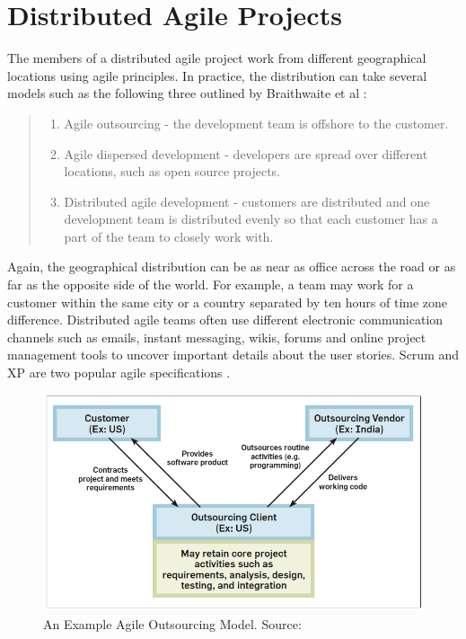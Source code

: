 \section{Distributed Agile Projects}
The members of a distributed agile project work from different geographical locations using agile principles. In practice, the distribution can take several models such as the following three outlined by Braithwaite et al \cite{xp_expanded}:

\begin{quote}
\begin{enumerate}
	\item Agile outsourcing - the development team is offshore to the customer.
	\item Agile dispersed development - developers are spread over different locations, such as open source projects.
	\item Distributed agile development - customers are distributed and one development team is distributed evenly so that each customer has a part of the team to closely work with.
\end{enumerate}
\end{quote}

Again, the geographical distribution can be as near as office across the road or as far as the opposite side of the world. For example, a team may work for a customer within the same city or a country separated by ten hours of time zone difference. Distributed agile teams often use different electronic communication channels such as emails, instant messaging, wikis, forums and online project management tools to uncover important details about the user stories. Scrum and XP are two popular agile specifications \cite{scrum, xp}.

\begin{figure}[bt]
	\centering
	\includegraphics[width=\textwidth]{Distributed.png}
    \caption{An Example Agile Outsourcing Model. Source: \cite{modified_agile}}
	\label{fig:distributed}
\end{figure}

